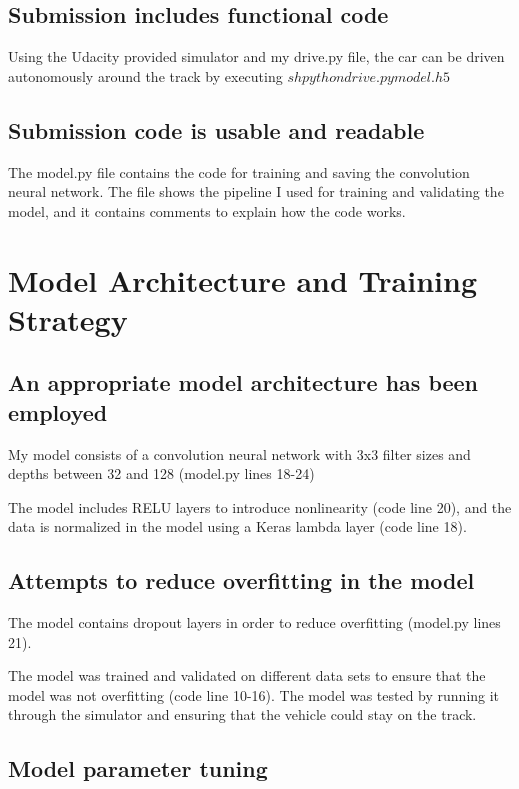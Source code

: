 \documentclass[a4paper, 11pt, DIV=14]{scrartcl}
\begin{document}
\subsection{Submission includes functional code}
Using the Udacity provided simulator and my drive.py file, the car can be driven autonomously around the track by executing 
$sh
python drive.py model.h5
$

\subsection{Submission code is usable and readable}
The model.py file contains the code for training and saving the convolution neural network. The file shows the pipeline I used for training and validating the model, and it contains comments to explain how the code works.

\section{Model Architecture and Training Strategy}

\subsection{An appropriate model architecture has been employed}

My model consists of a convolution neural network with 3x3 filter sizes and depths between 32 and 128 (model.py lines 18-24) 

The model includes RELU layers to introduce nonlinearity (code line 20), and the data is normalized in the model using a Keras lambda layer (code line 18). 

\subsection{Attempts to reduce overfitting in the model}

The model contains dropout layers in order to reduce overfitting (model.py lines 21). 

The model was trained and validated on different data sets to ensure that the model was not overfitting (code line 10-16). The model was tested by running it through the simulator and ensuring that the vehicle could stay on the track.

\subsection{Model parameter tuning}
\end{document}
